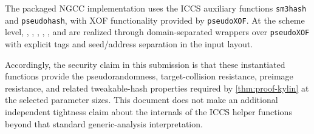 The packaged NGCC implementation uses the ICCS auxiliary functions
\texttt{sm3hash} and \texttt{pseudohash}, with XOF functionality provided by
\texttt{pseudoXOF}.  At the scheme level, \hashmsg, \PRF, \PRFmsg, \hashF,
\hashH, and \Th are realized through domain-separated wrappers over
\texttt{pseudoXOF} with explicit tags and seed/address separation in the input
layout.

Accordingly, the security claim in this submission is that these instantiated
functions provide the pseudorandomness, target-collision resistance, preimage
resistance, and related tweakable-hash properties required by
\cref{thm:proof-kylin} at the selected parameter sizes.  This document does not
make an additional independent tightness claim about the internals of the ICCS
helper functions beyond that standard generic-analysis interpretation.

